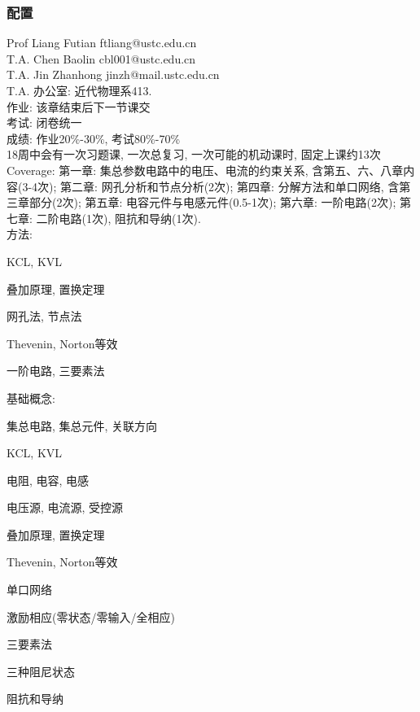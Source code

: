 \documentclass{ctexart}
\begin{document}
\subsubsection*{配置} %
\label{ssub:配置}

\noindent
Prof Liang Futian ftliang@ustc.edu.cn \\
T.A. Chen Baolin cbl001@ustc.edu.cn \\
T.A. Jin Zhanhong jinzh@mail.ustc.edu.cn \\
T.A. 办公室: 近代物理系413.\\
作业: 该章结束后下一节课交\\
考试: 闭卷统一\\
成绩: 作业20\%-30\%, 考试80\%-70\%\\
18周中会有一次习题课, 一次总复习, 一次可能的机动课时, 固定上课约13次\\
Coverage: 第一章: 集总参数电路中的电压、电流的约束关系, 含第五、六、八章内容(3-4次); 第二章: 网孔分析和节点分析(2次); 第四章: 分解方法和单口网络, 含第三章部分(2次); 第五章: 电容元件与电感元件(0.5-1次); 第六章: 一阶电路(2次); 第七章: 二阶电路(1次), 阻抗和导纳(1次). \\
方法:
\begin{cenum}
    \item KCL, KVL
    \item 叠加原理, 置换定理
    \item 网孔法, 节点法
    \item Thevenin, Norton等效
    \item 一阶电路, 三要素法
\end{cenum}
基础概念:
\begin{cenum}
    \item 集总电路, 集总元件, 关联方向
    \item KCL, KVL
    \item 电阻, 电容, 电感
    \item 电压源, 电流源, 受控源
    \item 叠加原理, 置换定理
    \item Thevenin, Norton等效
    \item 单口网络
    \item 激励相应(零状态/零输入/全相应)
    \item 三要素法
    \item 三种阻尼状态
    \item 阻抗和导纳
\end{cenum}

\end{document}
